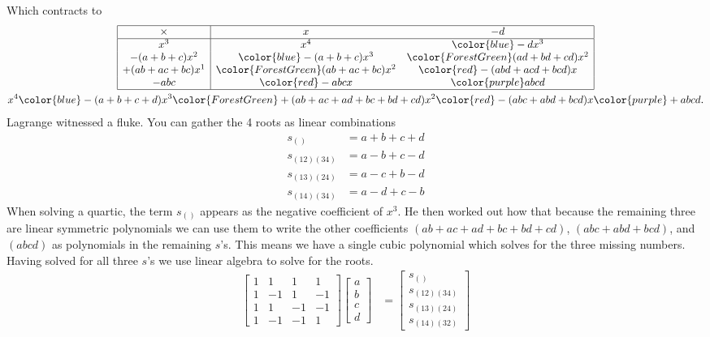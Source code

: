Which contracts to 
\begin{gather*}
    \begin{array}{|c|cc|}
        \hline 
         \times & x & -d \\
         \hline
        x^3 & x^4 & {\color{blue}-dx^3}\\
        -(a+b+c)x^2 & {\color{blue}-(a+b+c)x^3} & {\color{ForestGreen}(ad+bd+cd)x^2}\\
        +(ab+ac+bc)x^1 & {\color{ForestGreen}(ab+ac+bc)x^2} & {\color{red}-(abd+acd+bcd)x}\\
        -abc  & {\color{red}-abc x} & {\color{purple} abcd}\\
        \hline
    \end{array}\\
    x^4{\color{blue}-(a+b+c+d)x^3}
    {\color{ForestGreen}+(ab+ac+ad+bc+bd+cd)x^2}
    {\color{red}-(abc+abd+bcd)x}
    {\color{purple}+abcd}.
\end{gather*}
Lagrange witnessed a fluke.  You can gather the 4 roots as linear combinations
\begin{align*}
    s_{()} & = a+b+c+d\\
    s_{(12)(34)} & = a-b+c-d\\
    s_{(13)(24)} & = a-c+b-d\\
    s_{(14)(34)} & = a-d+c-b
\end{align*}
When solving a quartic, the term $s_{()}$ appears as the negative coefficient of 
$x^3$.  He then worked out how that because the remaining three are linear symmetric 
polynomials we can use them to write the other coefficients 
$(ab+ac+ad+bc+bd+cd)$, $(abc+abd+bcd)$, and $(abcd)$ as polynomials in 
the remaining $s$'s.  This means we have a single cubic polynomial which solves 
for the three missing numbers.  Having solved for all three $s$'s we use 
linear algebra to solve for the roots.
\begin{align*}
    \begin{bmatrix} 
        1 & 1 & 1 & 1\\
        1 & -1 & 1 & -1\\
        1 & 1 & -1 & -1\\
        1 & -1 & -1 & 1
    \end{bmatrix}
    \begin{bmatrix}
        a\\ b\\ c\\ d 
    \end{bmatrix}
    & = 
    \begin{bmatrix}
        s_{()}\\
        s_{(12)(34)}\\
        s_{(13)(24)}\\
        s_{(14)(32)}
    \end{bmatrix}
\end{align*}


